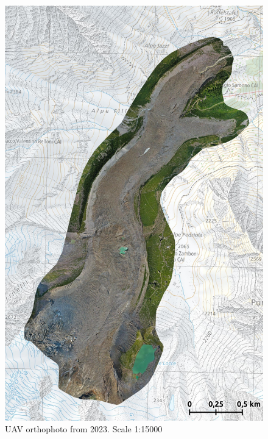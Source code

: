 \begin{figure}[p]
    \centering
    \includegraphics[width=\textwidth]{figures/appendix/orto_2023.jpg}
    \caption{UAV orthophoto from 2023. Scale 1:15000}
\end{figure}



